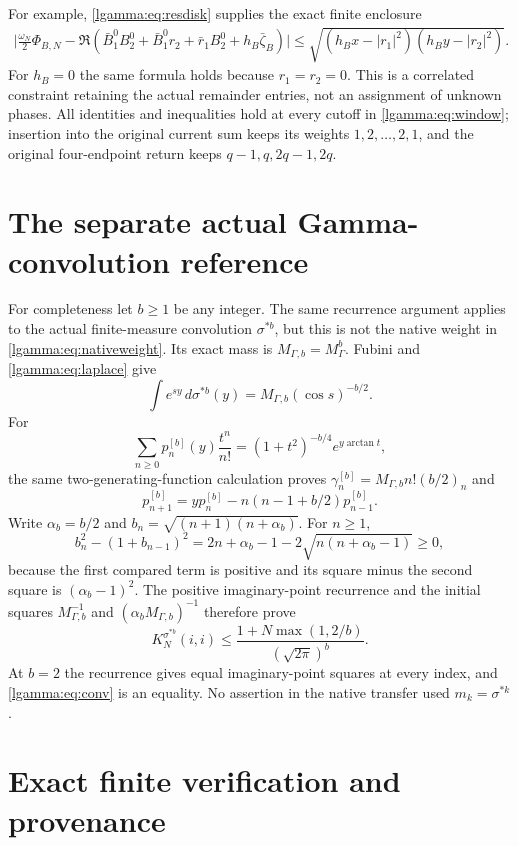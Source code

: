 For example, \eqref{lgamma:eq:resdisk} supplies the exact finite enclosure
\begin{equation}\label{lgamma:eq:currentdisk}
 \begin{split}
 \Big|\frac{\omega_N}2\Phi_{B,N}
 -\Re(\bar B_1^0B_2^0+\bar B_1^0r_2+\bar r_1B_2^0
                   +h_B\bar\zeta_B)\Big|
 \le\sqrt{(h_Bx-|r_1|^2)(h_By-|r_2|^2)}.
 \end{split}
\end{equation}
For $h_B=0$ the same formula holds because $r_1=r_2=0$.
This is a correlated constraint retaining the actual remainder entries,
not an assignment of unknown phases.  All identities and inequalities
hold at every cutoff in \eqref{lgamma:eq:window}; insertion into the original
current sum keeps its weights $1,2,\ldots,2,1$, and the original
four-endpoint return keeps $q-1,q,2q-1,2q$.

\section{The separate actual Gamma-convolution reference}

For completeness let $b\ge1$ be any integer.  The same recurrence
argument applies to the actual finite-measure convolution $\sigma^{*b}$,
but this is not the native weight in \eqref{lgamma:eq:nativeweight}.  Its exact
mass is $M_{\Gamma,b}=M_\Gamma^b$.  Fubini and \eqref{lgamma:eq:laplace} give
\[
 \int e^{sy}\,d\sigma^{*b}(y)=M_{\Gamma,b}(\cos s)^{-b/2}.
\]
For
\[
 \sum_{n\ge0}p_n^{[b]}(y)\frac{t^n}{n!}
 =(1+t^2)^{-b/4}e^{y\arctan t},
\]
the same two-generating-function calculation proves
$\gamma_n^{[b]}=M_{\Gamma,b}n!(b/2)_n$ and
\[
 p_{n+1}^{[b]}=yp_n^{[b]}-n(n-1+b/2)p_{n-1}^{[b]}.
\]
Write $\alpha_b=b/2$ and $b_n=\sqrt{(n+1)(n+\alpha_b)}$.
For $n\ge1$,
\[
 b_n^2-(1+b_{n-1})^2
 =2n+\alpha_b-1-2\sqrt{n(n+\alpha_b-1)}\ge0,
\]
because the first compared term is positive and its square minus the
second square is $(\alpha_b-1)^2$.  The positive imaginary-point
recurrence and the initial squares $M_{\Gamma,b}^{-1}$ and
$(\alpha_bM_{\Gamma,b})^{-1}$ therefore prove
\begin{equation}\label{lgamma:eq:conv}
 K_N^{\sigma^{*b}}(i,i)
 \le\frac{1+N\max(1,2/b)}{(\sqrt{2\pi})^b}.
\end{equation}
At $b=2$ the recurrence gives equal imaginary-point squares at every
index, and \eqref{lgamma:eq:conv} is an equality.  No assertion in the native
transfer used $m_k=\sigma^{*k}$.

\section{Exact finite verification and provenance}


